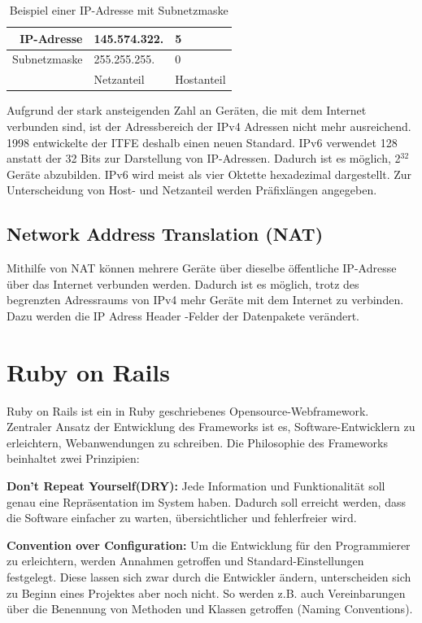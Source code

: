 \begin{table}
\begin{center}
\begin{tabular}{|r|l|l|}
	\hline
	IP-Adresse & 145.574.322. & 5 \\ \hline
	Subnetzmaske & 255.255.255. & 0 \\ \hline
	& Netzanteil & Hostanteil \\
	\hline
\end{tabular}
\caption{Beispiel einer IP-Adresse mit Subnetzmaske}
\end{center}
\end{table}


Aufgrund der stark ansteigenden Zahl an Geräten, die mit dem Internet verbunden sind, ist der Adressbereich der IPv4 Adressen nicht mehr ausreichend. 1998 entwickelte der ITFE deshalb einen neuen Standard. IPv6 verwendet 128 anstatt der 32 Bits zur Darstellung von IP-Adressen. Dadurch ist es möglich, 2$^{32}$ Geräte abzubilden. IPv6 wird meist als vier Oktette hexadezimal dargestellt. Zur Unterscheidung von Host- und Netzanteil werden Präfixlängen angegeben.  

\subsection{Network Address Translation (NAT)}
Mithilfe von NAT können mehrere Geräte über dieselbe öffentliche IP-Adresse über das Internet verbunden werden. Dadurch ist es möglich, trotz des begrenzten Adressraums von IPv4 mehr Geräte mit dem Internet zu verbinden. Dazu werden die IP Adress Header -Felder der Datenpakete verändert.\cite{rfc-nat}

\section{Ruby on Rails}
Ruby on Rails ist ein in Ruby geschriebenes Opensource-Webframework. Zentraler Ansatz der Entwicklung des Frameworks ist es, Software-Entwicklern zu erleichtern, Webanwendungen zu schreiben. Die Philosophie des Frameworks beinhaltet zwei Prinzipien\cite{ror-guide}:

\textbf{Don't Repeat Yourself(DRY):}
Jede Information und Funktionalität soll genau eine Repräsentation im System haben. Dadurch soll erreicht werden, dass die Software einfacher zu warten, über­sicht­licher und fehlerfreier wird.
 
\textbf{Convention over Configuration:}
Um die Entwicklung für den Programmierer zu erleichtern, werden Annahmen getroffen und Standard-Einstellungen festgelegt. Diese lassen sich zwar durch die Entwickler ändern, unterscheiden sich zu Beginn eines Projektes aber noch nicht. So werden z.B. auch Vereinbarungen über die Benennung von Methoden und Klassen getroffen (Naming Conventions).


